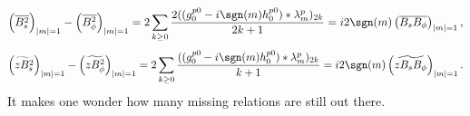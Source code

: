 \begin{equation}\label{eqn:coupling-bss-bpp-bsp-m1}
    \left(\overline{B_s^2}\right)_{|m|=1} - \left(\overline{B_\phi^2}\right)_{|m|=1} = 2 \sum_{k \geq 0} \frac{2((g_0^{p0} - i\sgn(m) h_0^{p0}) * \lambda_m^p)_{2k}}{2k+1} = i 2 \sgn(m) \left(\overline{B_s B_\phi}\right)_{|m|=1},
\end{equation}
\begin{equation}\label{eqn:coupling-bzss-bzpp-bzsp-m1}
    \left(\widetilde{zB_s^2}\right)_{|m|=1} - \left(\widetilde{z B_\phi^2}\right)_{|m|=1} = 2 \sum_{k \geq 0} \frac{((g_0^{p0} - i\sgn(m) h_0^{p0}) * \lambda_m^p)_{2k}}{k+1} = i 2 \sgn(m) \left(\widetilde{z B_s B_\phi}\right)_{|m|=1}.
\end{equation}
It makes one wonder how many missing relations are still out there. 

\clearpage

\appendix
